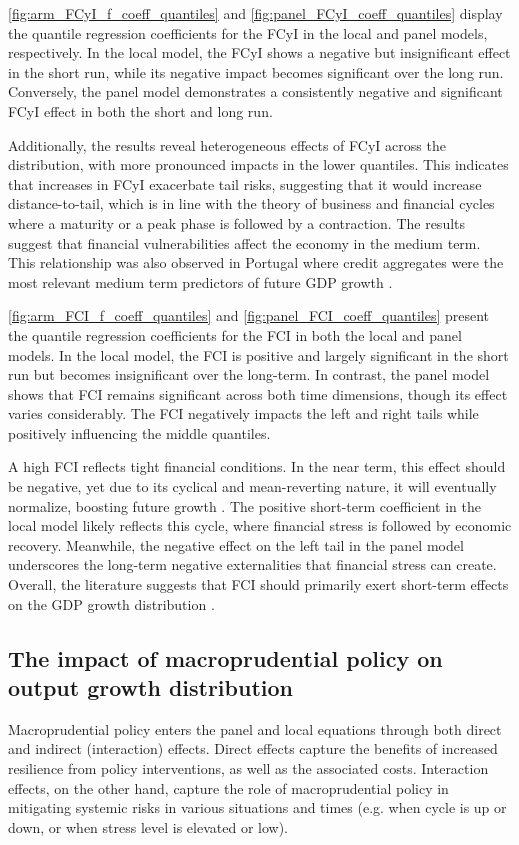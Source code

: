 \autoref{fig:arm_FCyI_f_coeff_quantiles} and \autoref{fig:panel_FCyI_coeff_quantiles} display the quantile regression coefficients for the FCyI in the local and panel models, respectively. In the local model, the FCyI shows a negative but insignificant effect in the short run, while its negative impact becomes significant over the long run. Conversely, the panel model demonstrates a consistently negative and significant FCyI effect in both the short and long run.

Additionally, the results reveal heterogeneous effects of FCyI across the distribution, with more pronounced impacts in the lower quantiles. This indicates that increases in FCyI exacerbate tail risks, suggesting that it would increase distance-to-tail, which is in line with the theory of business and financial cycles where a maturity or a peak phase is followed by a contraction. The results suggest that financial vulnerabilities affect the economy in the medium term. This relationship was also observed in Portugal where credit aggregates were the most relevant medium term predictors of future GDP growth \citep{imf_gar_2019}.

\autoref{fig:arm_FCI_f_coeff_quantiles} and \autoref{fig:panel_FCI_coeff_quantiles} present the quantile regression coefficients for the FCI in both the local and panel models. In the local model, the FCI is positive and largely significant in the short run but becomes insignificant over the long-term. In contrast, the panel model shows that FCI remains significant across both time dimensions, though its effect varies considerably. The FCI negatively impacts the left and right tails while positively influencing the middle quantiles.

A high FCI reflects tight financial conditions. In the near term, this effect should be negative, yet due to its cyclical and mean-reverting nature, it will eventually normalize, boosting future growth \citep{imf_gar_2019}. The positive short-term coefficient in the local model likely reflects this cycle, where financial stress is followed by economic recovery. Meanwhile, the negative effect on the left tail in the panel model underscores the long-term negative externalities that financial stress can create. Overall, the literature suggests that FCI should primarily exert short-term effects on the GDP growth distribution \citep{esrb2021}.

\subsection{The impact of macroprudential policy on output growth distribution}
Macroprudential policy enters the panel and local equations through both direct and indirect (interaction) effects. Direct effects capture the benefits of increased resilience from policy interventions, as well as the associated costs. Interaction effects, on the other hand, capture the role of macroprudential policy in mitigating systemic risks in various situations and times (e.g. when cycle is up or down, or when stress level is elevated or low).


